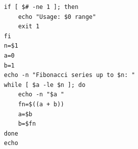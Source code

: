 \begin{verbatim}
if [ $# -ne 1 ]; then
    echo "Usage: $0 range"
    exit 1
fi
n=$1
a=0
b=1
echo -n "Fibonacci series up to $n: "
while [ $a -le $n ]; do
    echo -n "$a "
    fn=$((a + b))
    a=$b
    b=$fn
done
echo
\end{verbatim}